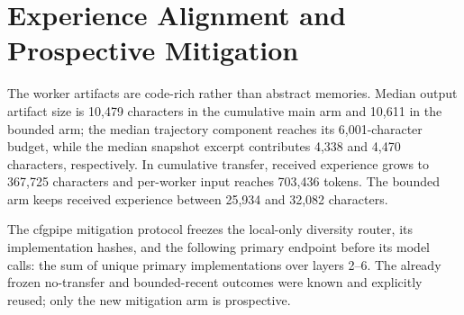 \documentclass[letterpaper]{article}
\begin{document}
\section{Experience Alignment and Prospective Mitigation}

\begin{table}[t]
\centering
\caption{Mechanism audit after layer 1. ``Exact'' is the fraction of recipients
matching at least one prior primary implementation. Line metrics take the best
available prior source per recipient.}
\label{tab:supp-alignment}
\small
{}
\end{table}

The worker artifacts are code-rich rather than abstract memories. Median output
artifact size is 10,479 characters in the cumulative main arm and 10,611 in the
bounded arm; the median trajectory component reaches its 6,001-character budget,
while the median snapshot excerpt contributes 4,338 and 4,470 characters,
respectively. In cumulative transfer, received experience grows to 367,725
characters and per-worker input reaches 703,436 tokens. The bounded arm keeps
received experience between 25,934 and 32,082 characters.

The cfgpipe mitigation protocol freezes the local-only diversity router, its
implementation hashes, and the following primary endpoint before its model calls:
the sum of unique primary implementations over layers 2--6. The already frozen
no-transfer and bounded-recent outcomes were known and explicitly reused; only
the new mitigation arm is prospective.

\begin{table}[t]
\centering
\caption{Prospective cfgpipe diversity-routing result. AUC is the sum of unique
primary implementations over layers 2--6.}
\label{tab:supp-mitigation}
\small
{}
\end{table}
\end{document}
